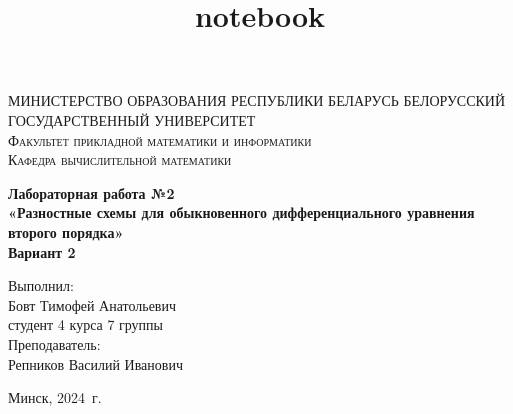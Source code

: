 \documentclass[a4paper, 12pt]{article}
\title{notebook}
\begin{document}
    
    	\begin{titlepage}
    	\begin{center}
    		\textsc{МИНИСТЕРСТВО ОБРАЗОВАНИЯ РЕСПУБЛИКИ БЕЛАРУСЬ БЕЛОРУССКИЙ ГОСУДАРСТВЕННЫЙ УНИВЕРСИТЕТ
    			\\[5mm]
    			Факультет прикладной математики и информатики\\[2mm]
    			Кафедра вычислительной математики
    		}
    		
    		\vfill
    		
    		\textbf{Лабораторная работа №2
    			\\[3mm]
    			«Разностные схемы для обыкновенного дифференциального уравнения второго порядка»\\[6mm]
    			Вариант 2
    			\\[20mm]
    		}
    	\end{center}
    	
    	\hfill
    	\begin{minipage}{.4\textwidth}
    		Выполнил:\\[2mm] 
    		Бовт Тимофей Анатольевич\\
    		студент 4 курса 7 группы\\[5mm]
    		
    		Преподаватель:\\[2mm] 
    		Репников Василий Иванович
    	\end{minipage}%
    	\vfill
    	\begin{center}
    		Минск, 2024\ г.
    	\end{center}
    \end{titlepage}
    
    \newpage
\end{document}
